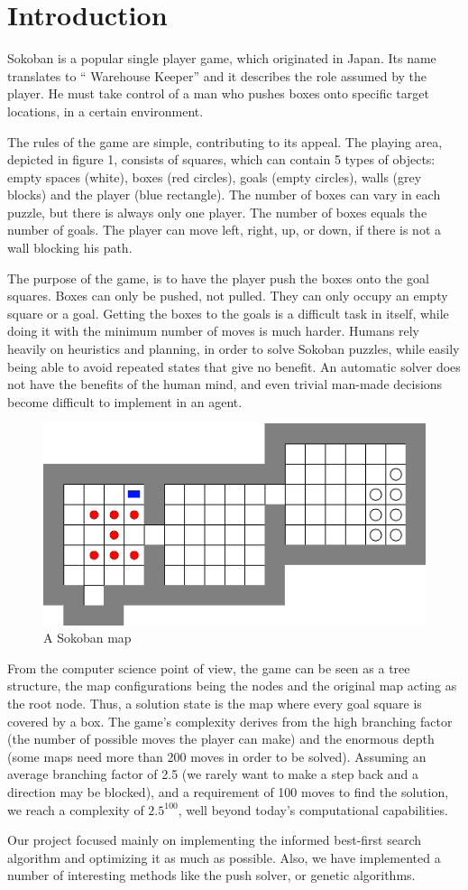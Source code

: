 \section{Introduction}\label{sec:introduction}
Sokoban is a popular single player game, which originated in Japan. Its name translates to `` Warehouse Keeper'' and it describes the role assumed by the player. He must take control of a man who pushes boxes onto specific target locations, in a certain environment. 

The rules of the game are simple, contributing to its appeal. The playing area, depicted in figure 1, consists of squares, which can contain 5 types of objects: empty spaces (white), boxes (red circles), goals (empty circles), walls (grey blocks) and the player (blue rectangle). The number of boxes can vary in each puzzle, but there is always only one player. The number of boxes equals the number of goals. The player can move left, right, up, or down, if there is not a wall blocking his path.

 The purpose of the game, is to have the player push the boxes onto the goal squares. Boxes can only be pushed, not pulled. They can only occupy an empty square or a goal. Getting the boxes to the goals is a difficult task in itself, while doing it with the minimum number of moves is much harder. Humans rely heavily on heuristics and planning, in order to solve Sokoban puzzles, while easily being able to avoid repeated states that give no benefit. An automatic solver does not have the benefits of the human mind, and even trivial man-made decisions become difficult to implement in an agent. \cite{junghanns1997sokoban}
 
\begin{figure}[h]
\includegraphics[scale=0.60]{./images/noDeadlocks.png}
\caption{A Sokoban map}
\end{figure}


From the computer science point of view, the game can be seen as a tree structure, the map configurations being the nodes and the original map acting as the root node. Thus, a solution state is the map where every goal square is covered by a box. The game's complexity derives from the high branching factor (the number of possible moves the player can make) and the enormous depth (some maps need more than 200 moves in order to be solved). Assuming an average branching factor of 2.5 (we rarely want to make a step back and a direction may be blocked), and a requirement of 100 moves to find the solution, we reach a complexity of $ 2.5^{100} $, well beyond today's computational capabilities. 

Our project focused mainly on implementing the informed best-first search algorithm and optimizing it as much as possible. Also, we have implemented a number of interesting methods like the push solver, or genetic algorithms.


  